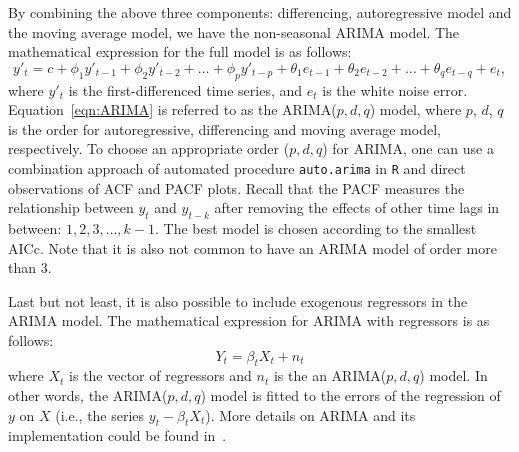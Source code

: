 \documentclass [11pt, proquest] {uwthesis}[2015/03/03]
\begin{document}
By combining the above three components: differencing, autoregressive model and the moving average model, we have the non-seasonal ARIMA model. The mathematical expression for the full model is as follows:
\begin{equation}
y'_t = c + \phi_1 y'_{t-1} + \phi_2 y'_{t-2} + \hdots + \phi_p y'_{t-p} + \theta_1 e_{t-1} + \theta_2 e_{t-2} + \hdots + \theta_q e_{t-q} + e_t, \label{eqn:ARIMA}
\end{equation}
where $y'_t$ is the first-differenced time series, and $e_t$ is the white noise error. Equation~\eqref{eqn:ARIMA} is referred to as the ARIMA($p,d,q$) model, where $p$, $d$, $q$ is the order for autoregressive, differencing and moving average model, respectively. To choose an appropriate order ($p,d,q$) for ARIMA, one can use a combination approach of automated procedure \texttt{auto.arima} in \texttt{R} and direct observations of ACF and PACF plots. Recall that the PACF measures the relationship between $y_t$ and $y_{t-k}$ after removing the effects of other time lags in between: $1, 2, 3, \hdots, k-1$. The best model is chosen according to the smallest AICc. Note that it is also not common to have an ARIMA model of order more than 3.

Last but not least, it is also possible to include exogenous regressors in the ARIMA model. The mathematical expression for ARIMA with regressors is as follows:
\[Y_t = \beta_t X_t + n_t\]
where $X_t$ is the vector of regressors and $n_t$ is the an ARIMA($p,d,q$) model. In other words, the ARIMA($p,d,q$) model is fitted to the errors of the regression of $y$ on $X$ (i.e., the series $y_t - \beta_t X_t$). More details on ARIMA and its implementation could be found in~\cite{Hall11}.



\end{document}
